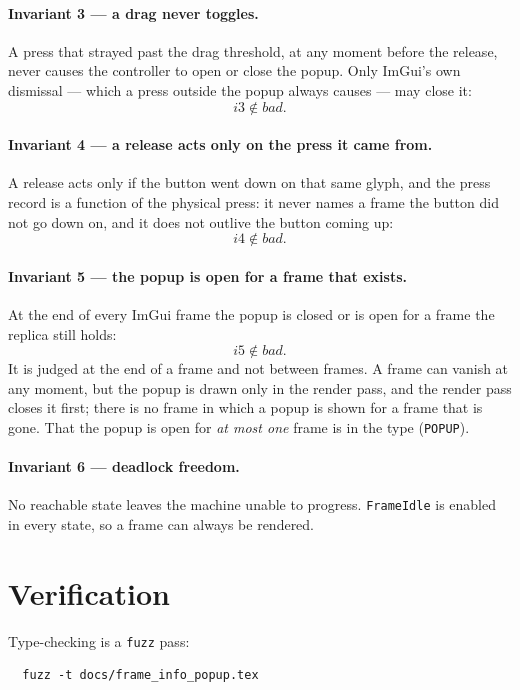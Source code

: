 \documentclass[a4paper,10pt,fleqn]{article}
\begin{document}
\paragraph{Invariant 3 --- a drag never toggles.}
A press that strayed past the drag threshold, at any moment before the release,
never causes the controller to open or close the popup.  Only ImGui's own
dismissal --- which a press outside the popup always causes --- may close it:
\[
  i3 \notin bad.
\]

\paragraph{Invariant 4 --- a release acts only on the press it came from.}
A release acts only if the button went down on that same glyph, and the press
record is a function of the physical press: it never names a frame the button
did not go down on, and it does not outlive the button coming up:
\[
  i4 \notin bad.
\]

\paragraph{Invariant 5 --- the popup is open for a frame that exists.}
At the end of every ImGui frame the popup is closed or is open for a frame the
replica still holds:
\[
  i5 \notin bad.
\]
It is judged at the end of a frame and not between frames.  A frame can vanish
at any moment, but the popup is drawn only in the render pass, and the render
pass closes it first; there is no frame in which a popup is shown for a frame
that is gone.  That the popup is open for \emph{at most one} frame is in the
type (\texttt{POPUP}).

\paragraph{Invariant 6 --- deadlock freedom.}
No reachable state leaves the machine unable to progress.  \texttt{FrameIdle}
is enabled in every state, so a frame can always be rendered.

\section{Verification}
\label{sec:verify}

Type-checking is a \texttt{fuzz} pass:
\begin{verbatim}
  fuzz -t docs/frame_info_popup.tex
\end{verbatim}
\end{document}
